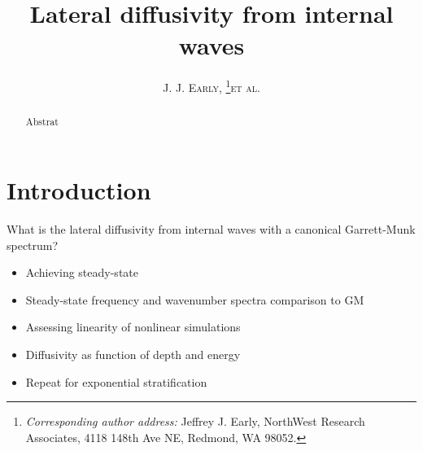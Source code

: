 \documentclass[10pt]{article}
\newcommand{\myabstract}{Abstrat}
\begin{document}
%
%
\title{\textbf{\large{Lateral diffusivity from internal waves}}}
%
%
\author{\textsc{J. J. Early,}
				\thanks{\textit{Corresponding author address:} 
				Jeffrey J. Early, NorthWest Research Associates, 
				4118 148th Ave NE, Redmond, WA 98052. 
				}\quad\textsc{et al.}
}
%
{
\twocolumn[
\begin{@twocolumnfalse}
\amstitle

\begin{center}
\begin{minipage}{13.0cm}
\begin{abstract}
	\myabstract
	\newline
	\begin{center}
		\rule{38mm}{0.2mm}
	\end{center}
\end{abstract}
\end{minipage}
\end{center}
\end{@twocolumnfalse}
]
}
{
\amstitle
\begin{abstract}
\myabstract
\end{abstract}
\newpage
}


%
\section{Introduction}
%
What is the lateral diffusivity from internal waves with a canonical Garrett-Munk spectrum?
\begin{itemize}
\item Achieving steady-state
\item Steady-state frequency and wavenumber spectra comparison to GM
\item Assessing linearity of nonlinear simulations
\item Diffusivity as function of depth and energy
\item Repeat for exponential stratification
\end{itemize}
\end{document}
